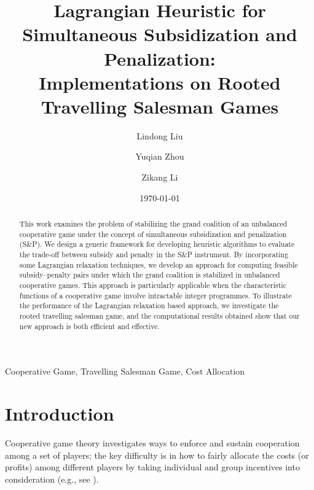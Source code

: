 \documentclass[authoryear,review,12pt]{elsarticle}
\begin{document}
\title{Lagrangian Heuristic for Simultaneous Subsidization and Penalization:
\\[7pt]
 Implementations on Rooted Travelling Salesman Games}

\author[ustc]{Lindong Liu}
\author[ustc]{Yuqian Zhou}
\author[ustc]{Zikang Li}


\address[ustc]{
\renewcommand{\baselinestretch}{1.5}
International Institute of Finance, School of Management,
\\[3pt]
 University of Science and Technology of China, Hefei 230026, China}

\begin{abstract}
This work examines the problem of stabilizing the grand coalition of an unbalanced cooperative game under the concept of  simultaneous subsidization and penalization (S\&P).
We design a generic framework for developing heuristic algorithms to evaluate the trade-off between subsidy and penalty in the S\&P instrument.
By incorporating some Lagrangian relaxation techniques, we develop an approach for computing feasible subsidy--penalty pairs under which the grand coalition is stabilized in unbalanced cooperative games.
This approach is particularly applicable when the characteristic functions of a cooperative game involve intractable integer programmes.
To illustrate the performance of the Lagrangian relaxation based approach, we investigate the rooted travelling salesman game, and the computational results obtained show that our new approach is both efficient and effective.\\
\end{abstract}

\begin{keyword}
Cooperative Game, Travelling Salesman Game, Cost Allocation
\end{keyword}

\maketitle
\date{\today}


\section{Introduction}\label{section:introduction}
Cooperative game theory investigates ways to enforce and sustain cooperation among a set of players; the key difficulty is in how to fairly allocate the costs (or profits) among different players by taking individual and group incentives into consideration (e.g., see \citealt{Jain2007CostSharing}).
\end{document}

